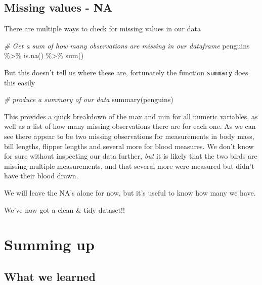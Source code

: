 \documentclass[
]{book}
\newenvironment{Shaded}{\begin{snugshade}}{\end{snugshade}}
\newcommand{\CommentTok}[1]{\textcolor[rgb]{0.56,0.35,0.01}{\textit{#1}}}
\newcommand{\FunctionTok}[1]{\textcolor[rgb]{0.00,0.00,0.00}{#1}}
\newcommand{\NormalTok}[1]{#1}
\newcommand{\SpecialCharTok}[1]{\textcolor[rgb]{0.00,0.00,0.00}{#1}}
\begin{document}
\hypertarget{missing-values---na}{%
\subsection{Missing values - NA}\label{missing-values---na}}

There are multiple ways to check for missing values in our data

\begin{Shaded}
\begin{Highlighting}[]
\CommentTok{\# Get a sum of how many observations are missing in our dataframe}
\NormalTok{penguins }\SpecialCharTok{\%\textgreater{}\%} 
  \FunctionTok{is.na}\NormalTok{() }\SpecialCharTok{\%\textgreater{}\%} 
  \FunctionTok{sum}\NormalTok{()}
\end{Highlighting}
\end{Shaded}

But this doesn't tell us where these are, fortunately the function \texttt{summary} does this easily

\begin{Shaded}
\begin{Highlighting}[]
\CommentTok{\# produce a summary of our data}
\FunctionTok{summary}\NormalTok{(penguins)}
\end{Highlighting}
\end{Shaded}

This provides a quick breakdown of the max and min for all numeric variables, as well as a list of how many missing observations there are for each one. As we can see there appear to be two missing observations for measurements in body mass, bill lengths, flipper lengths and several more for blood measures. We don't know for sure without inspecting our data further, \emph{but} it is likely that the two birds are missing multiple measurements, and that several more were measured but didn't have their blood drawn.

We will leave the NA's alone for now, but it's useful to know how many we have.

We've now got a clean \& tidy dataset!!

\hypertarget{summing-up}{%
\section{Summing up}\label{summing-up}}

\hypertarget{what-we-learned}{%
\subsection{What we learned}\label{what-we-learned}}
\end{document}
